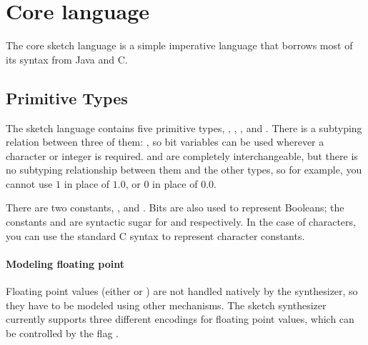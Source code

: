 \section{Core language}
The core sketch language is a simple imperative language that borrows most of its syntax from Java and C. 

\subsection{Primitive Types}
The sketch language contains five primitive types, , , ,  and . There is a subtyping relation between three of them:
, so bit variables can be used wherever a character or integer is required. 
 and  are completely interchangeable, but there is no subtyping relationship between them and the other types, so for example, you cannot use $1$ in place of $1.0$, or $0$ in place of $0.0$. 

There are two  constants, , and . Bits are also used to represent Booleans; the constants  and  are syntactic sugar for  and  respectively. In the case of characters, you can use the standard C syntax to represent character constants. 

\paragraph{Modeling floating point} Floating point values (either  or ) are not handled natively by the synthesizer, so they have to be modeled using other mechanisms. The sketch synthesizer currently supports three different encodings for floating point values, which can be controlled by the flag .



